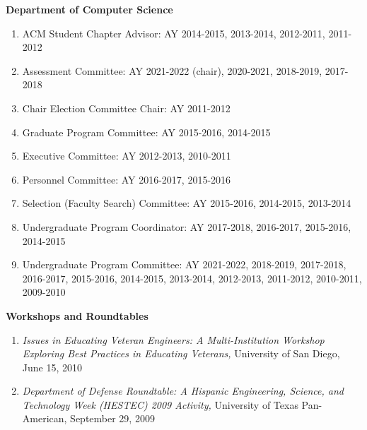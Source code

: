 \documentclass[11pt]{letter}
\begin{document}
\textbf{Department of Computer Science}
\begin{enumerate}
\item ACM Student Chapter Advisor: AY 2014-2015, 2013-2014, 2012-2011, 2011-2012
\item Assessment Committee: AY 2021-2022 (chair), 2020-2021, 2018-2019, 2017-2018
\item Chair Election Committee Chair: AY 2011-2012
\item Graduate Program Committee: AY 2015-2016, 2014-2015
\item Executive Committee: AY 2012-2013, 2010-2011
\item Personnel Committee: AY 2016-2017, 2015-2016
\item Selection (Faculty Search) Committee: AY 2015-2016, 2014-2015, 2013-2014
\item Undergraduate Program Coordinator: AY 2017-2018, 2016-2017, 2015-2016, 2014-2015
\item Undergraduate Program Committee: AY 2021-2022, 2018-2019, 2017-2018, 2016-2017, 2015-2016, 2014-2015, 2013-2014, 2012-2013, 2011-2012, 2010-2011, 2009-2010
\end{enumerate}

\textbf{Workshops and Roundtables}
\begin{enumerate}
\item \emph{Issues in Educating Veteran Engineers: A Multi-Institution Workshop Exploring Best Practices in Educating Veterans,} University of San Diego, June 15, 2010
\item \emph{Department of Defense Roundtable: A Hispanic Engineering, Science, and Technology Week (HESTEC) 2009 Activity,} University of Texas Pan-American, September 29, 2009
\end{enumerate}
\end{document}
